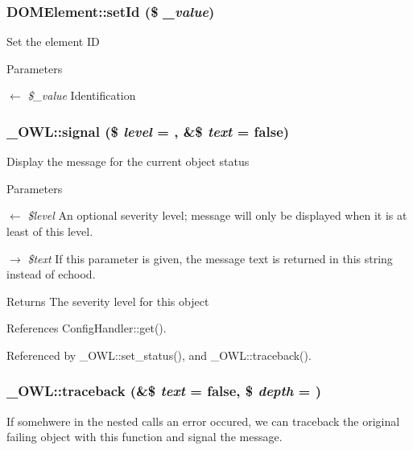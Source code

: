 \subsubsection[{setId}]{\setlength{\rightskip}{0pt plus 5cm}DOMElement::setId (\$ {\em \_\-value})}\label{classDOMElement_afb849b6d94ad4911d255e7ede4ee0d83}
Set the element ID 
\begin{DoxyParams}{Parameters}
\item[\mbox{$\leftarrow$} {\em \$\_\-value}]Identification \end{DoxyParams}
\subsubsection[{signal}]{\setlength{\rightskip}{0pt plus 5cm}\_\-OWL::signal (\$ {\em level} = {}, \/  \&\$ {\em text} = {\ttfamily false})}\label{class__OWL_a51ba4a16409acf2a2f61f286939091a5}
Display the message for the current object status


\begin{DoxyParams}{Parameters}
\item[\mbox{$\leftarrow$} {\em \$level}]An optional severity level; message will only be displayed when it is at least of this level. \item[\mbox{$\rightarrow$} {\em \$text}]If this parameter is given, the message text is returned in this string instead of echood. \end{DoxyParams}
\begin{DoxyReturn}{Returns}
The severity level for this object 
\end{DoxyReturn}


References ConfigHandler::get().



Referenced by \_\-OWL::set\_\-status(), and \_\-OWL::traceback().

\subsubsection[{traceback}]{\setlength{\rightskip}{0pt plus 5cm}\_\-OWL::traceback (\&\$ {\em text} = {\ttfamily false}, \/  \$ {\em depth} = {})}\label{class__OWL_aa29547995d6741b7d2b90c1d4ea99a13}
If somehwere in the nested calls an error occured, we can traceback the original failing object with this function and signal the message.


